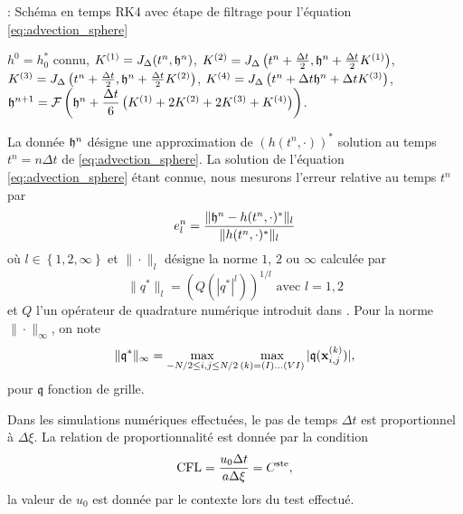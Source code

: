 \begin{center}
\begin{minipage}[H]{12cm}
  \begin{algorithm}[H]
    \caption{: Schéma en temps RK4 avec étape de filtrage pour l'équation \eqref{eq:advection_sphere} }\label{alg:RK4_transportSa}
    \begin{algorithmic}[1]
    \State $h^0 = h_0^*$ connu,
             \State  $K^{(1)} = J_{\Delta}(t^n, \mathfrak{h}^n)$,
             \State  $K^{(2)} = J_{\Delta}\left(t^n + \frac{\Delta t}{2}, \mathfrak{h}^n + \frac{\Delta t}{2} K^{(1)} \right)$,
             \State  $K^{(3)} = J_{\Delta}\left(t^n + \frac{\Delta t}{2}, \mathfrak{h}^n + \frac{\Delta t}{2} K^{(2)} \right)$,
             \State  $K^{(4)} = J_{\Delta}\left(t^n + \Delta t \mathfrak{h}^n + \Delta t K^{(3)} \right)$,  
             \State  $\mathfrak{h}^{n+1} = \mathcal{F}\left( \mathfrak{h}^n  + \dfrac{\Delta t}{6} \left( K^{(1)} + 2 K^{(2)} + 2 K^{(3)} + K^{(4)} \right) \right)$.
            \EndFor
    \end{algorithmic}
    \end{algorithm}
\end{minipage}
\end{center}

La donnée $\mathfrak{h}^n$ désigne une approximation de $(h(t^n,\cdot))^*$ solution au temps $t^n = n \Delta t$ de \eqref{eq:advection_sphere}.
La solution de l'équation \eqref{eq:advection_sphere} étant connue, nous mesurons l'erreur relative au temps $t^n$ par
\begin{equation}
e_l^n = \dfrac{\| \mathfrak{h}^n - h(t^n,\cdot)^* \|_l}{\| h(t^n,\cdot)^* \|_l}
\end{equation}
où $l \in \left\lbrace 1, 2, \infty \right\rbrace$ et $\| \cdot \|_l$ désigne la norme $1$, $2$ ou $\infty$ calculée par
\begin{equation}
\| q^* \|_l = \left( Q(|q^*|^l ) \right)^{1/l} \text{ avec } l=1,2
\end{equation}
et $Q$ l'un opérateur de quadrature numérique introduit dans \cite{Portelenelle2018}. Pour la norme $\| \cdot \|_{\infty}$, on note
\begin{equation}
\|  \mathfrak{q}^* \|_{\infty} = \max_{-N/2 \leq i,j \leq N/2} \max_{(k) = (I) ... (VI)} |\mathfrak{q}(\mathbf{x}_{i,j}^{(k)})|,
\end{equation}
pour $\mathfrak{q}$ fonction de grille.

Dans les simulations numériques effectuées, le pas de temps $\Delta t$ est proportionnel à $\Delta \xi$. La relation de proportionnalité est donnée par la condition
\begin{equation}
\text{CFL} = \dfrac{u_0 \Delta t}{a \Delta \xi} =C^{\text{ste}},
\end{equation}
la valeur de $u_0$ est donnée par le contexte lors du test effectué.















